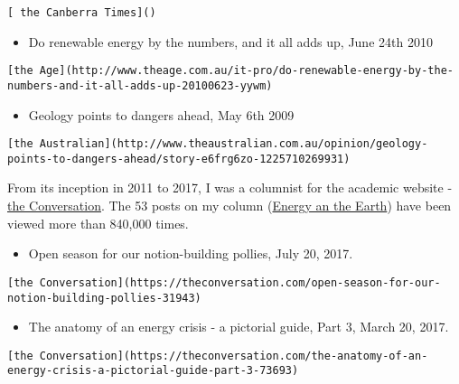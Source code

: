 \documentclass[
]{article}
\providecommand{\tightlist}{%
  \setlength{\itemsep}{0pt}\setlength{\parskip}{0pt}}
\begin{document}
\begin{verbatim}
[ the Canberra Times]()
\end{verbatim}

\begin{itemize}
\tightlist
\item
  Do renewable energy by the numbers, and it all adds up, June 24th 2010
\end{itemize}

\begin{verbatim}
[the Age](http://www.theage.com.au/it-pro/do-renewable-energy-by-the-numbers-and-it-all-adds-up-20100623-yywm)
\end{verbatim}

\begin{itemize}
\tightlist
\item
  Geology points to dangers ahead, May 6th 2009
\end{itemize}

\begin{verbatim}
[the Australian](http://www.theaustralian.com.au/opinion/geology-points-to-dangers-ahead/story-e6frg6zo-1225710269931)
\end{verbatim}

From its inception in 2011 to 2017, I was a columnist for the academic
website - \href{https://theconversation.com}{the Conversation}. The 53
posts on my column
(\href{https://theconversation.com/columns/mike-sandiford-228}{Energy an
the Earth}) have been viewed more than 840,000 times.

\begin{itemize}
\tightlist
\item
  Open season for our notion-building pollies, July 20, 2017.
\end{itemize}

\begin{verbatim}
[the Conversation](https://theconversation.com/open-season-for-our-notion-building-pollies-31943)
\end{verbatim}

\begin{itemize}
\tightlist
\item
  The anatomy of an energy crisis - a pictorial guide, Part 3, March 20,
  2017.
\end{itemize}

\begin{verbatim}
[the Conversation](https://theconversation.com/the-anatomy-of-an-energy-crisis-a-pictorial-guide-part-3-73693)
\end{verbatim}
\end{document}
